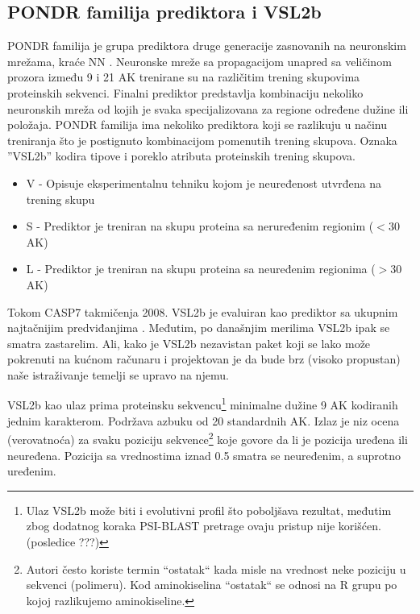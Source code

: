 \subsection{PONDR familija prediktora i VSL2b}
\label{VSL2b}

PONDR familija  je grupa
prediktora druge generacije zasnovanih na neuronskim mrežama, kraće NN .
Neuronske mreže sa propagacijom unapred  sa veličinom
prozora između 9 i 21 AK trenirane su na različitim trening skupovima
proteinskih sekvenci.  Finalni prediktor predstavlja kombinaciju nekoliko
neuronskih mreža od kojih je svaka specijalizovana za regione određene dužine
ili položaja.  PONDR familija ima nekoliko prediktora koji  se razlikuju u
načinu treniranja što je postignuto kombinacijom pomenutih trening skupova.
Oznaka ''VSL2b'' kodira tipove i poreklo atributa proteinskih trening skupova.
\begin{itemize}
  \item V - Opisuje eksperimentalnu tehniku kojom je neuređenost utvrđena na
    trening skupu 
  \item S - Prediktor je treniran na skupu proteina sa 
      neruređenim regionim ($<30$ AK)
  \item L - Prediktor je treniran na skupu proteina sa 
    neuređenim regionima ($>30$ AK)
\end{itemize}

Tokom CASP7 takmičenja 2008. VSL2b je evaluiran kao prediktor sa ukupnim
najtačnijim predviđanjima \parencite{bohe2009}. Međutim, po današnjim merilima
\parencite{meng2017} VSL2b ipak se smatra zastarelim.  Ali, kako je VSL2b
nezavistan paket koji se lako može pokrenuti na kućnom računaru i projektovan
je da bude brz (visoko propustan) naše istraživanje temelji se upravo na njemu.

VSL2b kao ulaz prima proteinsku sekvencu\footnote{
Ulaz VSL2b može biti i evolutivni profil što poboljšava rezultat,  međutim zbog
dodatnog koraka PSI-BLAST pretrage ovaju pristup nije korišćen.
(posledice ???)
}
minimalne dužine 9 AK kodiranih jednim
karakterom. Podržava azbuku od 20 standardnih AK.  Izlaz je niz
ocena (verovatnoća) za svaku poziciju sekvence\footnote{ Autori često koriste termin ``ostatak``  kada misle na vrednost neke poziciju u sekvenci (polimeru).
  Kod aminokiselina ``ostatak`` se odnosi na R grupu po kojoj razlikujemo aminokiseline.}
koje govore da li je pozicija uređena ili neuređena. Pozicija sa vrednostima iznad
0.5 smatra se neuređenim, a suprotno uređenim.





